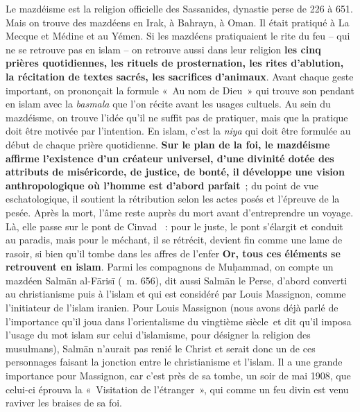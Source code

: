 Le mazdéisme est la religion officielle des Sassanides, dynastie perse
de 226 à 651. Mais on trouve des mazdéens en Irak, à Bahrayn, à Oman. Il
était pratiqué à La Mecque et Médine et au Yémen. Si les mazdéens
pratiquaient le rite du feu -- qui ne se retrouve pas en islam -- on
retrouve aussi dans leur religion \textbf{les cinq prières quotidiennes,
les rituels de prosternation, les rites d'ablution, la récitation de
textes sacrés, les sacrifices d'animaux}. Avant chaque geste important,
on prononçait la formule «~Au nom de Dieu~» qui trouve son pendant en
islam avec la \emph{basmala} que l'on récite avant les usages cultuels.
Au sein du mazdéisme, on trouve l'idée qu'il ne suffit pas de pratiquer,
mais que la pratique doit être motivée par l'intention. En islam, c'est
la \emph{niya} qui doit être formulée au début de chaque prière
quotidienne. \textbf{Sur le plan de la foi, le mazdéisme affirme
l'existence d'un créateur universel, d'une divinité dotée des attributs
de miséricorde, de justice, de bonté, il développe une vision
anthropologique où l'homme est d'abord parfait}~; du point de vue
eschatologique, il soutient la rétribution selon les actes posés et
l'épreuve de la pesée. Après la mort, l'âme reste auprès du mort avant
d'entreprendre un voyage. Là, elle passe sur le pont de Cinvad ~: pour
le juste, le pont s'élargit et conduit au paradis, mais pour le méchant,
il se rétrécit, devient fin comme une lame de rasoir, si bien qu'il
tombe dans les affres de l'enfer \textbf{Or, tous ces éléments se
retrouvent en islam}. Parmi les compagnons de Muḥammad, on compte un
mazdéen Salmān al-Fārisī (~m. 656), dit aussi Salmān le Perse, d'abord
converti au christianisme puis à l'islam et qui est considéré par Louis
Massignon, comme l'initiateur de l'islam iranien. Pour Louis Massignon
(nous avons déjà parlé de l'importance qu'il joua dans l'orientalisme du
vingtième siècle~et dit qu'il imposa l'usage du mot islam sur celui
d'islamisme, pour désigner la religion des musulmans), Salmān n'aurait
pas renié le Christ et serait donc un de ces personnages faisant la
jonction entre le christianisme et l'islam. Il a une grande importance
pour Massignon, car c'est près de sa tombe, un soir de mai 1908, que
celui-ci éprouva la «~Visitation de l'étranger~», qui comme un feu divin
est venu raviver les braises de sa foi.


